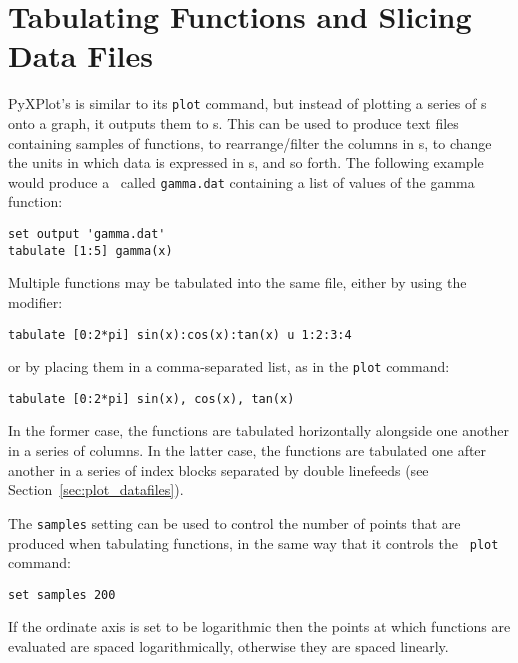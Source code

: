 \section{Tabulating Functions and Slicing Data Files}
\label{sec:tabulate}

PyXPlot's  is similar to its {\tt plot} command, but instead
of plotting a series of \datapoint s onto a graph, it outputs them to \datafile
s. This can be used to produce text files containing samples of functions, to
rearrange/filter the columns in \datafile s, to change the units in which data
is expressed in \datafile s, and so forth.  The following example would produce
a \datafile\ called {\tt gamma.dat} containing a list of values of the gamma
function:

\begin{verbatim}
set output 'gamma.dat'
tabulate [1:5] gamma(x)
\end{verbatim}

\noindent Multiple functions may be tabulated into the same file, either by
using the  modifier:

\begin{verbatim}
tabulate [0:2*pi] sin(x):cos(x):tan(x) u 1:2:3:4
\end{verbatim}

\noindent or by placing them in a comma-separated list, as in the {\tt plot}
command:

\begin{verbatim}
tabulate [0:2*pi] sin(x), cos(x), tan(x)
\end{verbatim}

In the former case, the functions are tabulated horizontally alongside one
another in a series of columns. In the latter case, the functions are tabulated
one after another in a series of index blocks separated by double linefeeds
(see Section~\ref{sec:plot_datafiles}).

The {\tt samples} setting can be used to control the number of points that are
produced when tabulating functions, in the same way that it controls the {\tt
plot} command:

\begin{verbatim}
set samples 200
\end{verbatim}

\noindent If the ordinate axis is set to be logarithmic then the points at which
functions are evaluated are spaced logarithmically, otherwise they are spaced
linearly.

